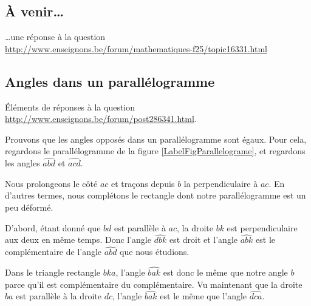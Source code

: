\documentclass[a4paper,12pt]{book}
\theoremstyle{mes_exemples}	\newtheorem{exemple}[numtho]{Exemple}
\theoremstyle{mes_tho}
\begin{document}
					\subsection{À venir\ldots}

\ldots une réponse à la question\\
\url{http://www.enseignons.be/forum/mathematiques-f25/topic16331.html}


\subsection{Angles dans un parallélogramme}

Éléments de réponses à la question
\href{http://www.enseignons.be/forum/post286341.html}{http://www.enseignons.be/forum/post286341.html}.


\newcommand{\CaptionFigParallelograme}{Le parallélogramme}



Prouvons que les angles opposés dans un parallélogramme sont égaux. Pour cela, regardons le parallélogramme de la figure \ref{LabelFigParallelograme}, et regardons les angles $\widehat{abd}$ et $\widehat{acd}$.

Nous prolongeons le côté $ac$ et traçons depuis $b$ la perpendiculaire à $ac$. En d'autres termes, nous \og complétons\fg{} le rectangle dont notre parallélogramme est un peu déformé.

D'abord, étant donné que $bd$ est parallèle à $ac$, la droite $bk$ est perpendiculaire aux deux en même temps. Donc l'angle $\widehat{dbk}$ est droit et l'angle $\widehat{abk}$ est le complémentaire de l'angle $\widehat{abd}$ que nous étudions.

Dans le triangle rectangle $bka$, l'angle $\widehat{bak}$ est donc le même que notre angle $b$ parce qu'il est complémentaire du complémentaire. Vu maintenant que la droite $ba$ est parallèle à la droite $dc$, l'angle $\widehat{bak}$ est le même que l'angle $\widehat{dca}$.

\end{document}
